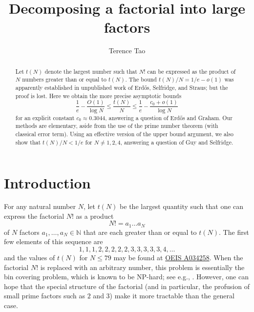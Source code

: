 \documentclass[12pt,a4paper,reqno]{amsart}
\numberwithin{equation}{section}
\theoremstyle{plain}
\theoremstyle{definition}
\newcommand\N{\mathbb{N}}
\begin{document}
\title{Decomposing a factorial into large factors}

\author{Terence Tao}
\address{UCLA Department of Mathematics, Los Angeles, CA 90095-1555.}



\begin{abstract}  Let $t(N)$ denote the largest number such that $N!$ can be expressed as the product of $N$ numbers greater than or equal to $t(N)$.
The bound $t(N)/N = 1/e-o(1)$ was apparently established in unpublished work of Erd\H{o}s, Selfridge, and Straus; but the proof is lost.  Here we obtain the more precise asymptotic bounds
$$ \frac{1}{e} - \frac{O(1)}{\log N} \leq \frac{t(N)}{N} \leq \frac{1}{e} - \frac{c_0+o(1)}{\log N}$$
for an explicit constant $c_0 \approx 0.3044$, answering a question of Erd\H{o}s and Graham.  Our methods are elementary, aside from the use of the prime number theorem (with classical error term).  Using an effective version of the upper bound argument, we also show that $t(N)/N < 1/e$ for $N \neq 1,2,4$, answering a question of Guy and Selfridge.
\end{abstract}

\maketitle


\section{Introduction}

For any natural number $N$, let $t(N)$ be the largest quantity such that one can express the factorial $N!$ as a product
\begin{equation}\label{an}
 N! = a_1 \dots a_N
\end{equation}
of $N$ factors $a_1,\dots,a_N \in \N$ that are each greater than or equal to $t(N)$. The first few elements of this sequence are
$$ 1,1,1,2,2,2,2,2,3,3,3,3,3,4, \dots$$
and the values of $t(N)$ for $N \leq 79$ may be found at \href{https://oeis.org/A034258}{OEIS A034258}.  When the factorial $N!$ is replaced with an arbitrary number, this problem is essentially the bin covering problem, which is known to be NP-hard; see e.g., \cite{bincover}.  However, one can hope that the special structure of the factorial (and in particular, the profusion of small prime factors such as $2$ and $3$) make it more tractable than the general case.
\end{document}

